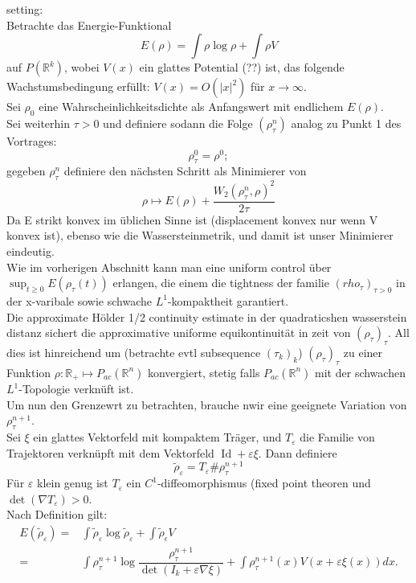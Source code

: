 \documentclass[11pt,a4paper,notitlepage]{scrreprt}
\newcommand{\RR}{\mathbb{R}}
\begin{document}
setting: \\
Betrachte das Energie-Funktional \[E(\rho)=\int \rho \log \rho + \int\rho V\] auf $P(\RR^k)$, wobei $V(x)$ ein glattes Potential (??) ist, das folgende Wachstumsbedingung erfüllt: $V(x)=O(\vert x \vert^2)$ für $x\to\infty$.\\
Sei $\rho_0$ eine Wahrscheinlichkeitsdichte als Anfangswert mit endlichem $E(\rho)$.\\
Sei weiterhin $\tau>0$ und definiere sodann die Folge $(\rho_\tau^n)$ analog zu Punkt 1 des Vortrages:\\

\[\rho_\tau^0=\rho^0; \]
gegeben $\rho_\tau^n$ definiere den nächsten Schritt als Minimierer von
\begin{equation*} \rho \mapsto E(\rho)+\dfrac{W_2(\rho_\tau^n,\rho)^2}{2\tau}
\end{equation*}
Da E strikt konvex im üblichen Sinne ist (displacement konvex nur wenn V konvex ist), ebenso wie die Wassersteinmetrik, und damit ist unser Minimierer eindeutig. \\
Wie im vorherigen Abschnitt kann man eine uniform control über $\sup_{t\geq 0} E(\rho_\tau(t))$ erlangen, die einem die tightness der familie $(rho_\tau)_{\tau >0}$ in der x-varibale sowie schwache $L^1$-kompaktheit garantiert. \\
Die approximate Hölder 1/2 continuity estimate in der quadraticshen wasserstein distanz sichert die approximative uniforme equikontinuität in zeit von $(\rho_\tau)_\tau$. All dies ist hinreichend um (betrachte evtl subsequence $(\tau_k)_k$) $(\rho_\tau)_\tau$ zu einer Funktion $\rho: \RR_+ \mapsto P_{ac}(\RR^n)$ konvergiert, stetig falls $P_{ac}(\RR^n)$ mit der schwachen $L^1$-Topologie verknüft ist. \\
Um nun den Grenzewrt zu betrachten, brauche nwir eine geeignete Variation von $\rho_\tau^{n+1}$.\\
Sei $\xi$ ein glattes Vektorfeld mit kompaktem Träger, und $T_\varepsilon$ die Familie von Trajektoren verknüpft mit dem Vektorfeld $\operatorname{Id} +\varepsilon\xi$. Dann definiere
\[\tilde{\rho}_\varepsilon=T_\varepsilon \#\rho_\tau^{n+1} \]
Für $\varepsilon$ klein genug ist $T_\varepsilon$ ein $C^1$-diffeomorphismus (fixed point theoren und $\det(\nabla T_\varepsilon)>0$.\\
Nach Definition gilt:
\begin{eqnarray}
E(\tilde{\rho}_\varepsilon)=&\int\tilde{\rho}_\varepsilon\log\tilde{\rho}_\varepsilon+\int\tilde{\rho}_\epsilon V\\
=&\int \rho_\tau^{n+1}\log\dfrac{\rho_\tau^{n+1}}{\det(I_k+\varepsilon \nabla \xi)}+\int \rho_\tau^{n+1}(x)V(x+\varepsilon\xi(x))dx.
\end{eqnarray}
\end{document}
